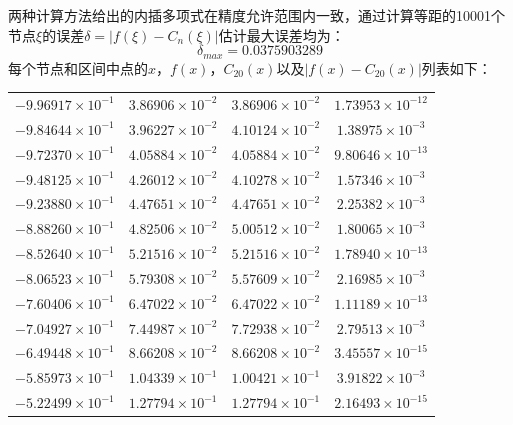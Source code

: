 \documentclass[a4paper]{book}
\begin{document}
\begin{enumerate}
两种计算方法给出的内插多项式在精度允许范围内一致，通过计算等距的10001个节点$\xi$的误差$\delta=|f(\xi)-C_n(\xi)|$估计最大误差均为：
\[
    \delta_{max} = 0.0375903289
\]
每个节点和区间中点的$x$，$f(x)$，$C_{20}(x)$以及$|f(x)-C_{20}(x)|$列表如下：

\bigskip
\begin{center}
    \tabletail{\hline}
    \tablelasttail{\hline}
    \begin{supertabular}{|cccc|}
        $-9.96917\times10^{-1}$ & $3.86906\times10^{-2}$ & $3.86906\times10^{-2}$ & $1.73953\times10^{-12}$ \\
        $-9.84644\times10^{-1}$ & $3.96227\times10^{-2}$ & $4.10124\times10^{-2}$ & $1.38975\times10^{-3}$  \\
        $-9.72370\times10^{-1}$ & $4.05884\times10^{-2}$ & $4.05884\times10^{-2}$ & $9.80646\times10^{-13}$ \\
        $-9.48125\times10^{-1}$ & $4.26012\times10^{-2}$ & $4.10278\times10^{-2}$ & $1.57346\times10^{-3}$  \\
        $-9.23880\times10^{-1}$ & $4.47651\times10^{-2}$ & $4.47651\times10^{-2}$ & $2.25382\times10^{-3}$  \\
        $-8.88260\times10^{-1}$ & $4.82506\times10^{-2}$ & $5.00512\times10^{-2}$ & $1.80065\times10^{-3}$  \\
        $-8.52640\times10^{-1}$ & $5.21516\times10^{-2}$ & $5.21516\times10^{-2}$ & $1.78940\times10^{-13}$ \\
        $-8.06523\times10^{-1}$ & $5.79308\times10^{-2}$ & $5.57609\times10^{-2}$ & $2.16985\times10^{-3}$  \\
        $-7.60406\times10^{-1}$ & $6.47022\times10^{-2}$ & $6.47022\times10^{-2}$ & $1.11189\times10^{-13}$ \\
        $-7.04927\times10^{-1}$ & $7.44987\times10^{-2}$ & $7.72938\times10^{-2}$ & $2.79513\times10^{-3}$  \\
        $-6.49448\times10^{-1}$ & $8.66208\times10^{-2}$ & $8.66208\times10^{-2}$ & $3.45557\times10^{-15}$ \\
        $-5.85973\times10^{-1}$ & $1.04339\times10^{-1}$ & $1.00421\times10^{-1}$ & $3.91822\times10^{-3}$  \\
        $-5.22499\times10^{-1}$ & $1.27794\times10^{-1}$ & $1.27794\times10^{-1}$ & $2.16493\times10^{-15}$ \\

\end{supertabular}
\end{center}
\end{enumerate}
\end{document}
